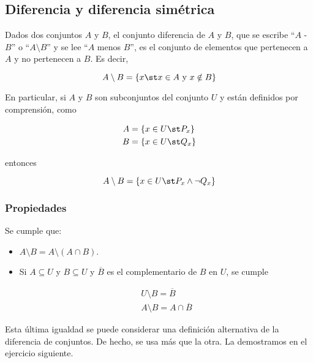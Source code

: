 \subsection{Diferencia y diferencia simétrica}

Dados dos conjuntos $A$ y $B$, el conjunto diferencia de $A$ y $B$, que se
escribe ``$A$ - $B$'' o ``$A \setminus B$'' y se lee ``$A$ menos $B$'', es
el conjunto de elementos que pertenecen a $A$ y no pertenecen a $B$. Es
decir,

$$ A \setminus B = \{x \st x \in A \ \text{y} \ x \notin B\} $$

En particular, si $A$ y $B$ son subconjuntos del conjunto $U$ y están
definidos por comprensión, como

\begin{align*}
  A &= \{x \in U \st P_x\} \\
  B &= \{x \in U \st Q_x\} \\
\end{align*}

\noindent entonces

$$ A \setminus B = \{x \in U \st P_x \land \neg Q_x\} $$



\subsubsection{Propiedades}

Se cumple que:

\begin{itemize}
  \item $A \setminus B = A \setminus (A \cap B)$.

  \item Si $A \subseteq U$ y $B \subseteq U$ y $\overline{B}$ es el
    complementario de $B$ en $U$, se cumple

    \begin{align*}
      U \setminus B = \overline{B} \\
      A \setminus B = A \cap \overline{B}
    \end{align*}
\end{itemize}

Esta última igualdad se puede considerar una definición alternativa de la
diferencia de conjuntos. De hecho, se usa más que la otra. La demostramos en
el ejercicio siguiente.

